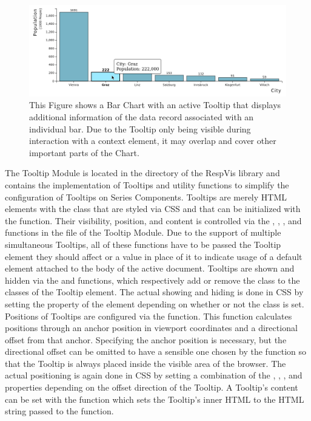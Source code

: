 \begin{figure}[tp]
\centering
\includegraphics[keepaspectratio,width=\linewidth,height=\fullh]{images/tooltip.png}
\caption[Tooltip Example]{
  This Figure shows a Bar Chart with an active Tooltip that displays additional information of the data record associated with an individual bar.
  Due to the Tooltip only being visible during interaction with a context element, it may overlap and cover other important parts of the Chart.
  }
  \label{fig:Tooltip}
\end{figure}
  
The Tooltip Module is located in the  directory of the RespVis library and contains the implementation of Tooltips and utility functions to simplify the configuration of Tooltips on Series Components.
Tooltips are merely HTML  elements with the  class that are styled via CSS and that can be initialized with the  function.
Their visibility, position, and content is controlled via the , , , and  functions in the  file of the Tooltip Module.
Due to the support of multiple simultaneous Tooltips, all of these functions have to be passed the Tooltip element they should affect or a  value in place of it to indicate usage of a default element attached to the body of the active document.
Tooltips are shown and hidden via the  and  functions, which respectively add or remove the  class to the classes of the Tooltip element.
The actual showing and hiding is done in CSS by setting the  property of the element depending on whether or not the  class is set.
Positions of Tooltips are configured via the  function. 
This function calculates positions through an anchor position in viewport coordinates and a directional offset from that anchor.
Specifying the anchor position is necessary, but the directional offset can be omitted to have a sensible one chosen by the  function so that the Tooltip is always placed inside the visible area of the browser.
The actual positioning is again done in CSS by setting a combination of the , , , and  properties depending on the offset direction of the Tooltip.
A Tooltip's content can be set with the  function which sets the Tooltip's inner HTML to the HTML string passed to the function.

